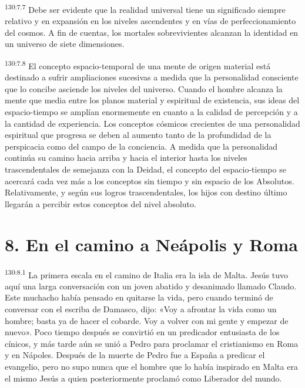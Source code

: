 \par 
\textsuperscript{130:7.7} Debe ser evidente que la realidad universal tiene un significado siempre relativo y en expansión en los niveles ascendentes y en vías de perfeccionamiento del cosmos. A fin de cuentas, los mortales sobrevivientes alcanzan la identidad en un universo de siete dimensiones.

\par 
\textsuperscript{130:7.8} El concepto espacio-temporal de una mente de origen material está destinado a sufrir ampliaciones sucesivas a medida que la personalidad consciente que lo concibe asciende los niveles del universo. Cuando el hombre alcanza la mente que media entre los planos material y espiritual de existencia, sus ideas del espacio-tiempo se amplían enormemente en cuanto a la calidad de percepción y a la cantidad de experiencia. Los conceptos cósmicos crecientes de una personalidad espiritual que progresa se deben al aumento tanto de la profundidad de la perspicacia como del campo de la conciencia. A medida que la personalidad continúa su camino hacia arriba y hacia el interior hasta los niveles trascendentales de semejanza con la Deidad, el concepto del espacio-tiempo se acercará cada vez más a los conceptos sin tiempo y sin espacio de los Absolutos. Relativamente, y según sus logros trascendentales, los hijos con destino último llegarán a percibir estos conceptos del nivel absoluto.

\section*{8. En el camino a Neápolis y Roma}
\par 
\textsuperscript{130:8.1} La primera escala en el camino de Italia era la isla de Malta. Jesús tuvo aquí una larga conversación con un joven abatido y desanimado llamado Claudo. Este muchacho había pensado en quitarse la vida, pero cuando terminó de conversar con el escriba de Damasco, dijo: «Voy a afrontar la vida como un hombre; basta ya de hacer el cobarde. Voy a volver con mi gente y empezar de nuevo». Poco tiempo después se convirtió en un predicador entusiasta de los cínicos, y más tarde aún se unió a Pedro para proclamar el cristianismo en Roma y en Nápoles. Después de la muerte de Pedro fue a España a predicar el evangelio, pero no supo nunca que el hombre que lo había inspirado en Malta era el mismo Jesús a quien posteriormente proclamó como Liberador del mundo.

